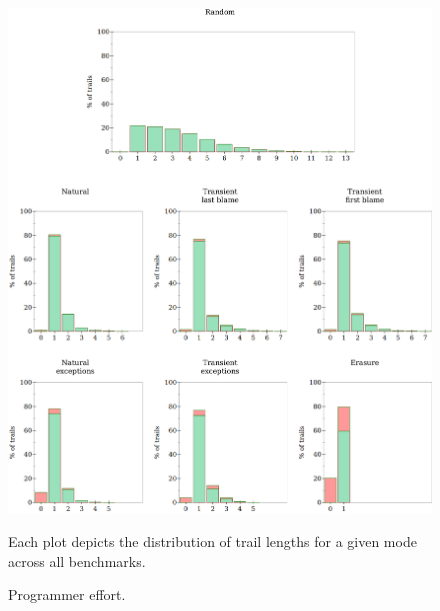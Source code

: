 \begin{figure}
  \centering
  \includegraphics[width=\textwidth]{./plots/bt-lengths-table}

  \vspace{1em}
  \begin{minipage}{0.95\textwidth}
  Each plot depicts the distribution of trail lengths for a given mode across all benchmarks.
  \end{minipage}

  \caption{Programmer effort.}
  \label{fig:effort-table}
\end{figure}

